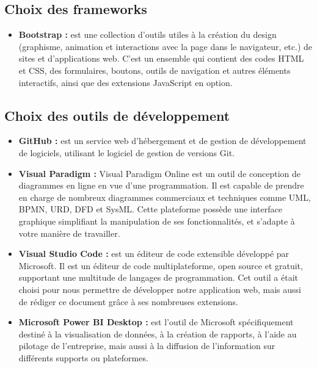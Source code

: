         \subsection[Choix des frameworks]{Choix des frameworks}
            \begin{itemize}
                \setlength{\itemsep}{0pt}
                \item [\ding{226}] \textbf{Bootstrap :} est une collection d'outils utiles à la création
                du design (graphisme, animation et interactions avec la page dans le navigateur, etc.) de sites
                et d'applications web. C'est un ensemble qui contient des codes HTML et CSS, des
                formulaires, boutons, outils de navigation et autres éléments interactifs, ainsi
                que des extensions JavaScript en option. \cite*{Wikiboot}
            \end{itemize}
        \subsection[Choix des outils de développement]{Choix des outils de développement}
            \begin{itemize}
                \setlength{\itemsep}{0pt}
                \item [\ding{226}] \textbf{GitHub :} est un service web d'hébergement et de gestion de
                développement de logiciels, utilisant le logiciel de gestion de versions Git. \cite*{Wikigithub} 
                \item [\ding{226}] \textbf{Visual Paradigm :} Visual Paradigm Online est un outil de conception de diagrammes en ligne
                en vue d’une programmation. Il est capable de prendre en charge de nombreux diagrammes commerciaux et techniques comme
                UML, BPMN, URD, DFD et SysML. Cette plateforme possède une interface graphique simplifiant la manipulation de ses fonctionnalités, et s’adapte à votre manière de travailler.
                \item [\ding{226}] \textbf{Visual Studio Code :} est un éditeur de code
                extensible développé par Microsoft. Il est un éditeur de code multiplateforme, open source et gratuit,
                supportant une multitude de langages de programmation. \cite*{Wikivsc} Cet outil a était choisi
                pour nous permettre de développer notre application web, mais aussi de rédiger ce document grâce à
                ses nombreuses extensions.
                \item [\ding{226}] \textbf{Microsoft Power BI Desktop :} est l’outil de Microsoft spécifiquement destiné à la visualisation de
                données, à la création de rapports, à l’aide au pilotage de l’entreprise, mais aussi à la
                diffusion de l’information sur différents supports ou plateformes. \cite*{Meyer2021}
            \end{itemize}
